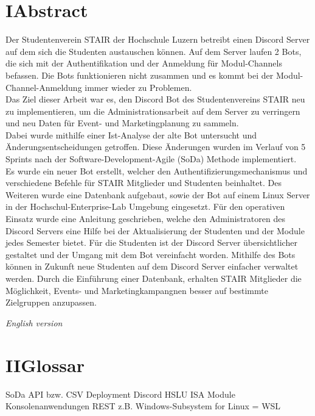 \documentclass[a4paper, table]{article}
\begin{document}
\section*{I{\hspace*{1cm}}Abstract}
Der Studentenverein STAIR der Hochschule Luzern betreibt einen Discord Server auf dem sich die Studenten austauschen können.
Auf dem Server laufen 2 Bots, die sich mit der Authentifikation und der Anmeldung für Modul-Channels befassen.
Die Bots funktionieren nicht zusammen und es kommt bei der Modul-Channel-Anmeldung immer wieder zu Problemen.\\
Das Ziel dieser Arbeit war es, den Discord Bot des Studentenvereins STAIR neu zu implementieren, 
um die Administrationsarbeit auf dem Server zu verringern und neu Daten für Event- und Marketingplanung zu sammeln.\\
Dabei wurde mithilfe einer Ist-Analyse der alte Bot untersucht und Änderungsentscheidungen getroffen.
Diese Änderungen wurden im Verlauf von 5 Sprints nach der Software-Development-Agile (SoDa) Methode implementiert.\\
Es wurde ein neuer Bot erstellt, welcher den Authentifizierungsmechanismus und verschiedene Befehle für STAIR Mitglieder und Studenten beinhaltet.
Des Weiteren wurde eine Datenbank aufgebaut, sowie der Bot auf einem Linux Server in der Hochschul-Enterprise-Lab Umgebung eingesetzt.
Für den operativen Einsatz wurde eine Anleitung geschrieben, welche den Administratoren des Discord Servers eine Hilfe bei der Aktualisierung der Studenten und der Module jedes Semester bietet.
Für die Studenten ist der Discord Server übersichtlicher gestaltet und der Umgang mit dem Bot vereinfacht worden.
Mithilfe des Bots können in Zukunft neue Studenten auf dem Discord Server einfacher verwaltet werden.
Durch die Einführung einer Datenbank, erhalten STAIR Mitglieder die Möglichkeit, Events- und Marketingkampangnen besser auf bestimmte Zielgruppen anzupassen.

\textit{English version}


\newpage
\section*{II{\hspace*{1cm}}Glossar}

SoDa
API
bzw.
CSV
Deployment
Discord
HSLU
ISA Module
Konsolenanwendungen
REST
z.B.
Windows-Subsystem for Linux = WSL
\end{document}
